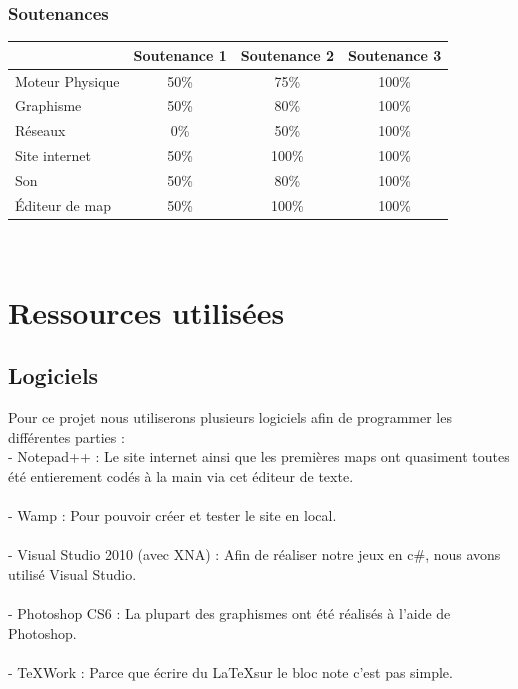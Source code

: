 \documentclass [11pt]{report}
\begin{document}
		\subsection{Soutenances}
			\begin{tabular}{| l | * {3}{c|}}
				\hline
		 		& Soutenance 1 & Soutenance 2 & Soutenance 3 \\
				\hline
				Moteur Physique & 50\% & 75\% & 100\% \\
				\hline
				 Graphisme & 50\% & 80\% & 100\% \\
				\hline
				Réseaux & 0\% & 50\% & 100\% \\
				\hline
				Site internet & 50\% & 100\%  & 100\%  \\
	          			 \hline
				Son & 50\% & 80\% & 100\% \\
				\hline
				\'Editeur de map & 50\% & 100\% & 100\% \\
				\hline
			\end{tabular}\\\vspace{4mm}


\chapter {Ressources utilisées}
	\section {Logiciels}

	Pour ce projet nous utiliserons plusieurs logiciels afin de programmer les différentes parties :\\

	- Notepad++ : Le site internet ainsi que les premières maps ont quasiment toutes été entierement codés à la main via cet éditeur de texte.\\\\\indent
	- Wamp : Pour pouvoir créer et tester le site en local.\\\\\indent
	- Visual Studio 2010 (avec XNA) : Afin de réaliser notre jeux en c\#, nous avons utilisé Visual Studio.\\\\\indent
	- Photoshop CS6 : La plupart des graphismes ont été réalisés à l'aide de Photoshop.\\\\\indent
	- TeXWork : Parce que écrire du \LaTeX sur le bloc note c'est pas simple.\\\vspace{10mm}
\end{document}
